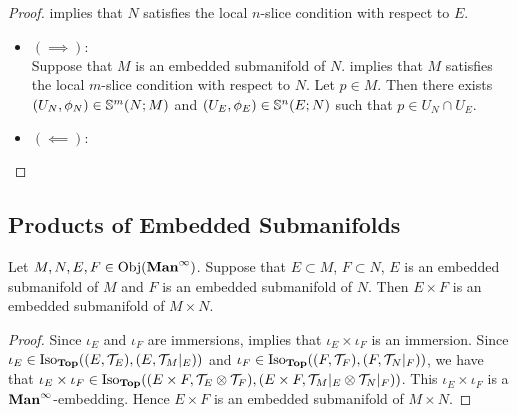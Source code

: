 \documentclass{book}
\begin{document}
	\begin{proof} implies that $N$ satisfies the local $n$-slice condition with respect to $E$.
		\begin{itemize}
			\item $(\implies):$ \\
			Suppose that $M$ is an embedded submanifold of $N$.  implies that $M$ satisfies the local $m$-slice condition with respect to $N$. Let $p \in M$. Then there exists $(U_N, \phi_N) \in \S^m(N; M)$ and $(U_E, \phi_E) \in \S^n(E;N)$ such that $p \in U_N \cap U_E$. 
			\item $(\impliedby):$ \\
			
		\end{itemize}
	\end{proof}
	
	
	
	
	
	
	
	
	
	
	
	
	
	
	
	
	
	
	
	
	
	
	
	\subsection{Products of Embedded Submanifolds}
	
	\begin{ex}
		Let $M, N, E, F \in \Obj(\Maninf)$. Suppose that $E \subset M$, $F \subset N$, $E$ is an embedded submanifold of $M$ and $F$ is an embedded submanifold of $N$. Then $E \times F$ is an embedded submanifold of $M \times N$.
	\end{ex}

	\begin{proof}
		Since $\iota_E$ and $\iota_F$ are immersions,  implies that $\iota_E \times \iota_F$ is an immersion. Since $\iota_E \in \Iso_{\Top}((E, \MT_E), (E, \MT_M|_E))$ and $\iota_F \in \Iso_{\Top}((F, \MT_F), (F, \MT_N|_F))$, we have that $\iota_E \times \iota_F \in \Iso_{\Top}((E \times F, \MT_E \otimes \MT_F), (E \times F, \MT_M|_E \otimes \MT_N|_F))$. This $\iota_E \times \iota_F$ is a $\Maninf$-embedding. Hence $E \times F$ is an embedded submanifold of $M \times N$.  
		
	\end{proof}
	
\end{document}
